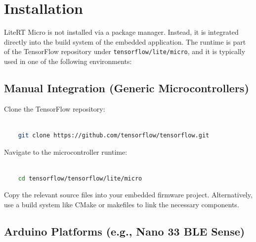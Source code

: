 \section{Installation}



LiteRT Micro is not installed via a package manager. Instead, it is integrated directly into the build system of the embedded application. The runtime is part of the TensorFlow repository under \texttt{tensorflow/lite/micro}, and it is typically used in one of the following environments:



\subsection{Manual Integration (Generic Microcontrollers)}



Clone the TensorFlow repository:



\begin{lstlisting}[language=bash, caption={Cloning TensorFlow repository}]

	git clone https://github.com/tensorflow/tensorflow.git

\end{lstlisting}



Navigate to the microcontroller runtime:



\begin{lstlisting}[language=bash, caption={Navigating to LiteRT Micro directory}]

	cd tensorflow/tensorflow/lite/micro

\end{lstlisting}



Copy the relevant source files into your embedded firmware project. Alternatively, use a build system like CMake or makefiles to link the necessary components.



\subsection{Arduino Platforms (e.g., Nano 33 BLE Sense)}



